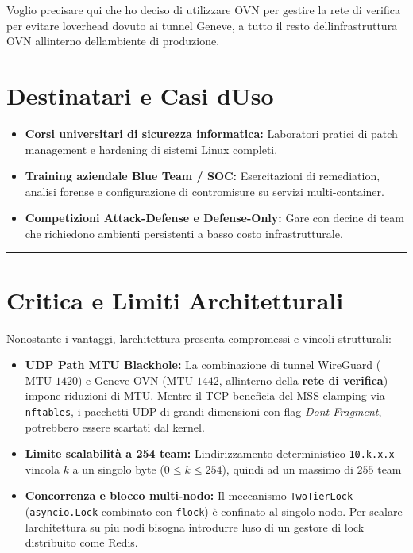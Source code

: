 Voglio precisare qui che ho deciso di utilizzare OVN per gestire la rete
di verifica per evitare l\textquotesingle overhead dovuto ai tunnel
Geneve, a tutto il resto dell\textquotesingle infrastruttura OVN
all\textquotesingle interno dell\textquotesingle ambiente di produzione.

\section{Destinatari e Casi
d\textquotesingle Uso}\label{destinatari-e-casi-duso}

\begin{itemize}
\tightlist
\item
  \textbf{Corsi universitari di sicurezza informatica:} Laboratori
  pratici di patch management e hardening di sistemi Linux completi.
\item
  \textbf{Training aziendale Blue Team / SOC:} Esercitazioni di
  remediation, analisi forense e configurazione di contromisure su
  servizi multi-container.
\item
  \textbf{Competizioni Attack-Defense e Defense-Only:} Gare con decine
  di team che richiedono ambienti persistenti a basso costo
  infrastrutturale.
\end{itemize}

\begin{center}\rule{0.5\linewidth}{0.5pt}\end{center}

\section{Critica e Limiti
Architetturali}\label{critica-e-limiti-architetturali}

Nonostante i vantaggi, l\textquotesingle architettura presenta
compromessi e vincoli strutturali:

\begin{itemize}
\tightlist
\item
  \textbf{UDP Path MTU Blackhole:} La combinazione di tunnel WireGuard
  (\(\text{MTU } 1420\)) e Geneve OVN (\(\text{MTU } 1442\),
  all\textquotesingle interno della \textbf{rete di verifica}) impone
  riduzioni di MTU. Mentre il TCP beneficia del MSS clamping via
  \passthrough{\lstinline!nftables!}, i pacchetti UDP di grandi
  dimensioni con flag \emph{Don\textquotesingle t Fragment}, potrebbero
  essere scartati dal kernel.
\item
  \textbf{Limite scalabilità a 254 team:}
  L\textquotesingle indirizzamento deterministico
  \passthrough{\lstinline!10.k.x.x!} vincola \(k\) a un singolo byte
  (\(0 \le k \le 254\)), quindi ad un massimo di \(\text{255}\) team
\item
  \textbf{Concorrenza e blocco multi-nodo:} Il meccanismo
  \passthrough{\lstinline!TwoTierLock!}
  (\passthrough{\lstinline!asyncio.Lock!} combinato con
  \passthrough{\lstinline!flock!}) è confinato al singolo nodo. Per
  scalare l\textquotesingle architettura su piu nodi bisogna introdurre
  l\textquotesingle uso di un gestore di lock distribuito come Redis.
\end{itemize}
